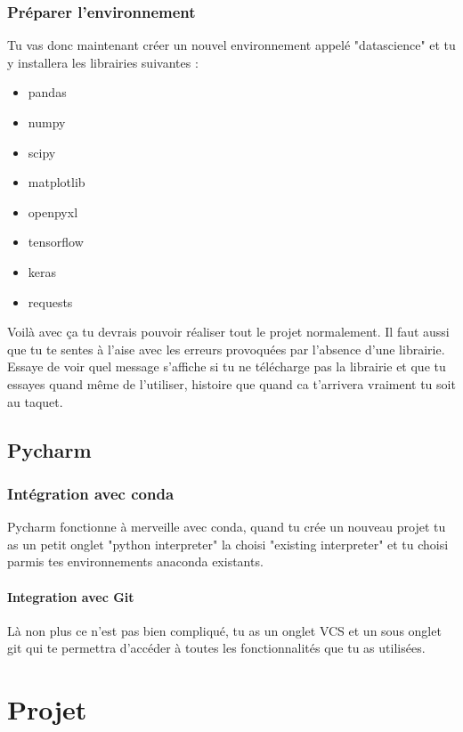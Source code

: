 \documentclass[10pt,a4paper]{book}
\begin{document}
\subsection{Préparer l'environnement}
Tu vas donc maintenant créer un nouvel environnement appelé "datascience" et tu y installera les librairies suivantes :
 
\begin{itemize}

\item pandas
\item numpy
\item scipy
\item matplotlib
\item openpyxl
\item tensorflow
\item keras
\item requests
\end{itemize}

Voilà avec ça tu devrais pouvoir réaliser tout le projet normalement.
Il faut aussi que tu te sentes à l'aise avec les erreurs provoquées par l'absence d'une librairie. Essaye de voir quel message s'affiche si tu ne télécharge pas la librairie et que tu essayes quand même de l'utiliser, histoire que quand ca t'arrivera vraiment tu soit au taquet.

\section{Pycharm}
\subsection{Intégration avec conda}
Pycharm fonctionne à merveille avec  conda, quand tu crée un nouveau projet tu as un petit onglet "python interpreter" la choisi "existing interpreter" et tu choisi parmis tes environnements anaconda existants.

\subsubsection{Integration avec Git}
Là non plus ce n'est pas bien compliqué, tu as un onglet VCS et un sous onglet git qui te permettra d'accéder à toutes les fonctionnalités que tu as utilisées.

\chapter{Projet}
\end{document}
